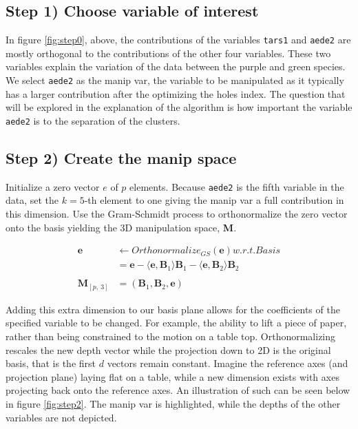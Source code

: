\documentclass{monashthesis}
\begin{document}
\hypertarget{step-1-choose-variable-of-interest}{%
\subsection{Step 1) Choose variable of interest}\label{step-1-choose-variable-of-interest}}

In figure \ref{fig:step0}, above, the contributions of the variables \texttt{tars1} and \texttt{aede2} are mostly orthogonal to the contributions of the other four variables. These two variables explain the variation of the data between the purple and green species. We select \texttt{aede2} as the manip var, the variable to be manipulated as it typically has a larger contribution after the optimizing the holes index. The question that will be explored in the explanation of the algorithm is how important the variable \texttt{aede2} is to the separation of the clusters.

\hypertarget{step-2-create-the-manip-space}{%
\subsection{Step 2) Create the manip space}\label{step-2-create-the-manip-space}}

Initialize a zero vector \(e\) of \(p\) elements. Because \texttt{aede2} is the fifth variable in the data, set the \(k=5\)-th element to one giving the manip var a full contribution in this dimension. Use the Gram-Schmidt process to orthonormalize the zero vector onto the basis yielding the 3D manipulation space, \textbf{M}.

\begin{align*}
  \textbf{e} &\leftarrow Orthonormalize_{GS}(\textbf{e}) w.r.t. Basis \\
  &= \textbf{e} - \langle \textbf{e},\textbf{B}_1 \rangle \textbf{B}_1 - \langle \textbf{e}, \textbf{B}_2 \rangle \textbf{B}_2 \\
  \\
  \textbf{M}_{[p,~3]} &= (\textbf{B}_1,\textbf{B}_2,\textbf{e})
\end{align*}

Adding this extra dimension to our basis plane allows for the coefficients of the specified variable to be changed. For example, the ability to lift a piece of paper, rather than being constrained to the motion on a table top. Orthonormalizing rescales the new depth vector while the projection down to 2D is the original basis, that is the first \(d\) vectors remain constant. Imagine the reference axes (and projection plane) laying flat on a table, while a new dimension exists with axes projecting back onto the reference axes. An illustration of such can be seen below in figure \ref{fig:step2}. The manip var is highlighted, while the depths of the other variables are not depicted.
\end{document}
